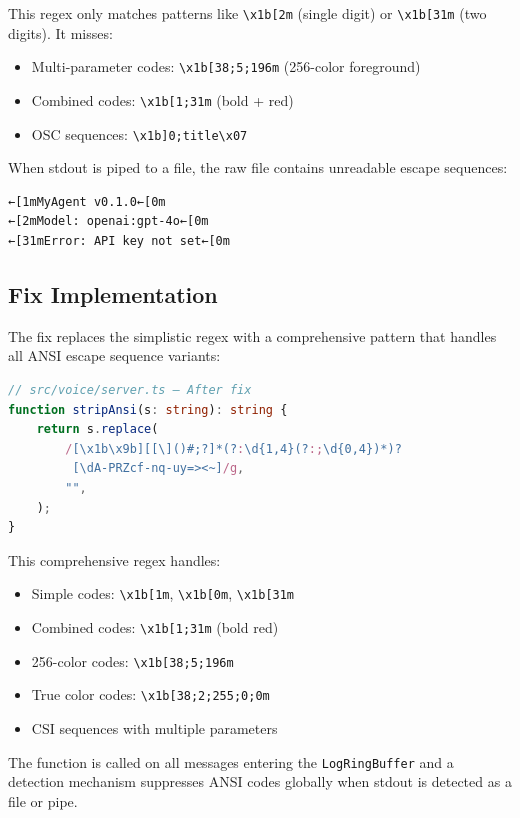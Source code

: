 This regex only matches patterns like \texttt{\textbackslash{}x1b[2m} (single digit) or \texttt{\textbackslash{}x1b[31m} (two digits). It misses:
\begin{itemize}
    \item Multi-parameter codes: \texttt{\textbackslash{}x1b[38;5;196m} (256-color foreground)
    \item Combined codes: \texttt{\textbackslash{}x1b[1;31m} (bold + red)
    \item OSC sequences: \texttt{\textbackslash{}x1b]0;title\textbackslash{}x07}
\end{itemize}

When stdout is piped to a file, the raw file contains unreadable escape sequences:

\begin{lstlisting}[language=text]
←[1mMyAgent v0.1.0←[0m
←[2mModel: openai:gpt-4o←[0m
←[31mError: API key not set←[0m
\end{lstlisting}

\subsection*{Fix Implementation}

The fix replaces the simplistic regex with a comprehensive pattern that handles all ANSI escape sequence variants:

\begin{lstlisting}[language=TypeScript]
// src/voice/server.ts — After fix
function stripAnsi(s: string): string {
    return s.replace(
        /[\x1b\x9b][[\]()#;?]*(?:\d{1,4}(?:;\d{0,4})*)?
         [\dA-PRZcf-nq-uy=><~]/g,
        "",
    );
}
\end{lstlisting}

This comprehensive regex handles:
\begin{itemize}
    \item Simple codes: \texttt{\textbackslash{}x1b[1m}, \texttt{\textbackslash{}x1b[0m}, \texttt{\textbackslash{}x1b[31m}
    \item Combined codes: \texttt{\textbackslash{}x1b[1;31m} (bold red)
    \item 256-color codes: \texttt{\textbackslash{}x1b[38;5;196m}
    \item True color codes: \texttt{\textbackslash{}x1b[38;2;255;0;0m}
    \item CSI sequences with multiple parameters
\end{itemize}

The function is called on all messages entering the \texttt{LogRingBuffer} and a detection mechanism suppresses ANSI codes globally when stdout is detected as a file or pipe.

